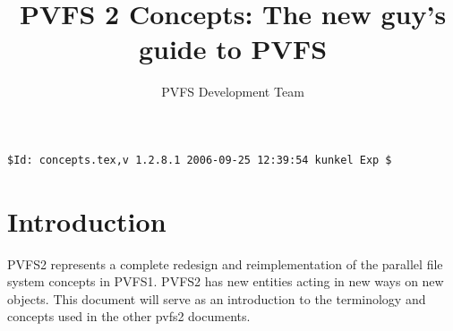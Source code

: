 \documentclass[10pt]{article} %
\title{PVFS 2 Concepts: The new guy's guide to PVFS}
\author{PVFS Development Team}
\begin{document}
\maketitle

\begin{verbatim}$Id: concepts.tex,v 1.2.8.1 2006-09-25 12:39:54 kunkel Exp $\end{verbatim}
\section{Introduction}

PVFS2 represents a complete redesign and reimplementation of the
parallel file system concepts in PVFS1.  PVFS2 has new entities acting
in new ways on new objects.  This document will serve as an introduction
to the terminology and concepts used in the other pvfs2 documents.

\end{document}
